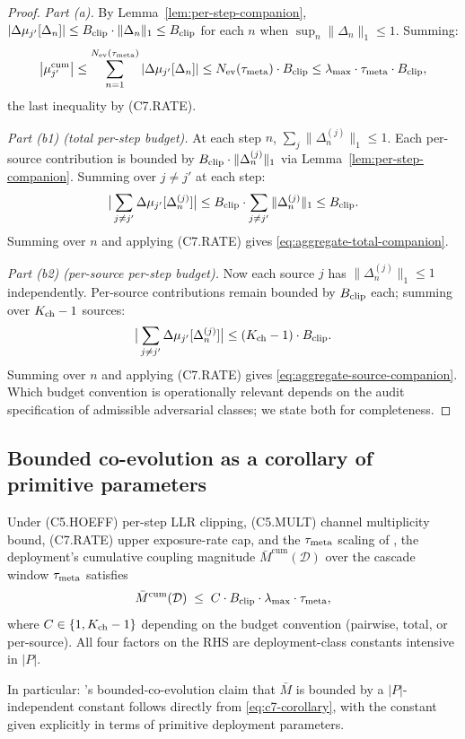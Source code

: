 \begin{proof}
\emph{Part (a).} By Lemma~\ref{lem:per-step-companion},
$|\Delta\mu_{j'}[\Delta_n]| \leq B_{\mathrm{clip}} \cdot \|\Delta_n\|_1
\leq B_{\mathrm{clip}}$ for each $n$ when $\sup_n \|\Delta_n\|_1 \leq 1$.
Summing:
\[
  \big| \mu_{j'}^{\mathrm{cum}} \big| \leq
  \sum_{n=1}^{N_{\mathrm{ev}}(\tau_{\mathrm{meta}})} |\Delta\mu_{j'}[\Delta_n]|
  \leq N_{\mathrm{ev}}(\tau_{\mathrm{meta}}) \cdot B_{\mathrm{clip}}
  \leq \lambda_{\max} \cdot \tau_{\mathrm{meta}} \cdot B_{\mathrm{clip}},
\]
the last inequality by (C7.RATE).

\emph{Part (b1) (total per-step budget).} At each step $n$,
$\sum_j \|\Delta_n^{(j)}\|_1 \leq 1$. Each per-source contribution
is bounded by $B_{\mathrm{clip}} \cdot \|\Delta_n^{(j)}\|_1$ via
Lemma~\ref{lem:per-step-companion}. Summing over $j \neq j'$ at
each step:
\[
  \big| \sum_{j \neq j'} \Delta\mu_{j'}[\Delta_n^{(j)}] \big|
  \leq B_{\mathrm{clip}} \cdot \sum_{j \neq j'} \|\Delta_n^{(j)}\|_1
  \leq B_{\mathrm{clip}}.
\]
Summing over $n$ and applying (C7.RATE) gives
\eqref{eq:aggregate-total-companion}.

\emph{Part (b2) (per-source per-step budget).} Now each source
$j$ has $\|\Delta_n^{(j)}\|_1 \leq 1$ independently. Per-source
contributions remain bounded by $B_{\mathrm{clip}}$ each; summing over
$K_{\mathrm{ch}} - 1$ sources:
\[
  \big| \sum_{j \neq j'} \Delta\mu_{j'}[\Delta_n^{(j)}] \big|
  \leq (K_{\mathrm{ch}} - 1) \cdot B_{\mathrm{clip}}.
\]
Summing over $n$ and applying (C7.RATE) gives
\eqref{eq:aggregate-source-companion}. Which budget convention is
operationally relevant depends on the audit specification of
admissible adversarial classes; we state both for completeness.
\end{proof}

\subsection{Bounded co-evolution as a corollary of primitive parameters}

\begin{theorem}
\label{thm:c7-corollary}
Under (C5.HOEFF) per-step LLR clipping, (C5.MULT) channel
multiplicity bound, (C7.RATE) upper exposure-rate cap, and the
$\tau_{\mathrm{meta}}$ scaling of \citep[Phase Redundancy]{lasser2026phase},
the deployment's cumulative coupling magnitude
$\bar{M}^{\mathrm{cum}}(\mathcal{D})$ over the cascade window
$\tau_{\mathrm{meta}}$ satisfies
\begin{equation}
\label{eq:c7-corollary}
  \bar{M}^{\mathrm{cum}}(\mathcal{D}) \;\leq\; C \cdot B_{\mathrm{clip}}
  \cdot \lambda_{\max} \cdot \tau_{\mathrm{meta}},
\end{equation}
where $C \in \{1, K_{\mathrm{ch}} - 1\}$ depending on the budget convention
(pairwise, total, or per-source). All four factors on the RHS are
deployment-class constants intensive in $|P|$.

In particular: \citep[Condition~(C7)]{lasser2026paper10}'s
bounded-co-evolution claim that $\bar{M}$ is bounded by a
$|P|$-independent constant follows directly from
\eqref{eq:c7-corollary}, with the constant given explicitly in
terms of primitive deployment parameters.
\end{theorem}

